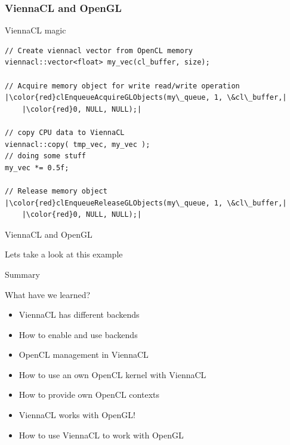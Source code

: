 \begin{frame}[fragile]
\frametitle{ViennaCL and OpenGL}

\begin{block}{ViennaCL magic}
  \begin{lstlisting}
// Create viennacl vector from OpenCL memory
viennacl::vector<float> my_vec(cl_buffer, size);

// Acquire memory object for write read/write operation
|\color{red}clEnqueueAcquireGLObjects(my\_queue, 1, \&cl\_buffer,|
    |\color{red}0, NULL, NULL);|

// copy CPU data to ViennaCL
viennacl::copy( tmp_vec, my_vec );
// doing some stuff
my_vec *= 0.5f;

// Release memory object
|\color{red}clEnqueueReleaseGLObjects(my\_queue, 1, \&cl\_buffer,|
    |\color{red}0, NULL, NULL);|
  \end{lstlisting}
\end{block}

\end{frame}



\begin{frame}{ViennaCL and OpenGL}

Lets take a look at this example

\end{frame}



\begin{frame}{Summary}
\begin{block}{What have we learned?}
  \begin{itemize}
   \item ViennaCL has different backends
   \item How to enable and use backends
   \item OpenCL management in ViennaCL
   \item How to use an own OpenCL kernel with ViennaCL
   \item How to provide own OpenCL contexts
   \item ViennaCL works with OpenGL!
   \item How to use ViennaCL to work with OpenGL
  \end{itemize}
\end{block}
\end{frame}







